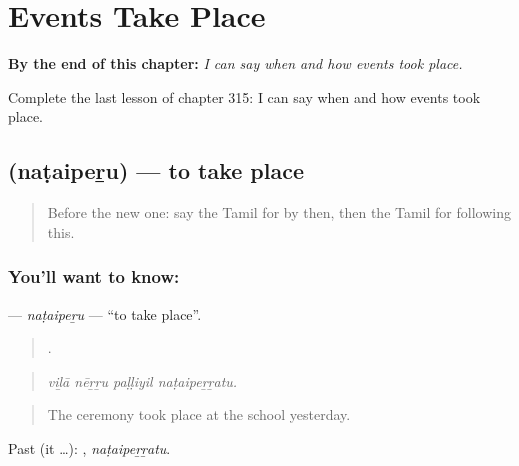 
\chapter{Events Take Place}
\label{ch:ta-events-take-place}

\begin{chapteropening}
\textbf{By the end of this chapter:} \emph{I can say when and how events took place.}

Complete the last lesson of chapter 315: I can say when and how events took place.
\end{chapteropening}

\section[\texorpdfstring{\ta{நடைபெறு} (naṭaipeṟu)}{நடைபெறு (naṭaipeṟu)}]{ (naṭaipeṟu) — to take place}

\label{lesson:TA-C315-nataiperu}



\begin{quote}
Before the new one: say the Tamil for by then, then the Tamil for following this.
\end{quote}

\subsection*{You'll want to know: }
\textbf{} — \emph{naṭaipeṟu} — \textquotedblleft{}to take place\textquotedblright{}.

\begin{quote}
   .
\end{quote}

\begin{quote}
\emph{viḻā nēṟṟu paḷḷiyil naṭaipeṟṟatu.}
\end{quote}

\begin{quote}
The ceremony took place at the school yesterday.
\end{quote}

Past (it …): , \emph{naṭaipeṟṟatu}.

